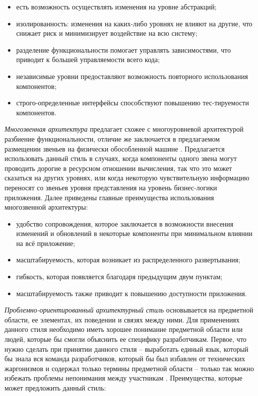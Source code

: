 \begin{itemize}
	\item есть возможность осуществлять изменения на уровне абстракций;
	\item изолированность: изменения на каких-либо уровнях не влияют на другие, что снижает риск и минимизирует воздействие на всю систему;
	\item разделение функциональности помогает управлять зависимостями, что приводит к большей управляемости всего кода;
  	\item независимые уровни предоставляют возможность повторного использования компонентов;
  	\item строго-определенные интерфейсы способствуют повышению тес-тируемости компонентов.
\end{itemize} 

\emph{Многозвенная архитектура} предлагает схожее с многоуровневой архитектурой разбиение функциональности, отличие же заключается в предлагаемом размещении 
звеньев на физически обособленной машине \cite{application_architecture_guide}. Предлагается использовать данный стиль в случаях, когда компоненты одного звена
могут проводить дорогие в ресурсном отношении вычисления, так что это может сказаться на других уровнях, или когда некоторую чувствительную информацию переносят 
со звеньев уровня представления на уровень бизнес-логики приложения. Далее приведены главные преимущества использования многозвенной архитектуры:

\begin{itemize}
	\item удобство сопровождения, которое заключается в возможности внесения изменений и обновлений в некоторые компоненты при минимальном влиянии на всё приложение;
	\item масштабируемость, которая возникает из распределенного развертывания;
	\item гибкость, которая появляется благодаря предыдущим двум пунктам;
  	\item масштабируемость также приводит к повышению доступности приложения.
\end{itemize} 

\emph{Проблемно-ориентированный архитектурный стиль} основывается на
предметной области, ее элементах, их поведении и связях между ними. Для
применениях данного стиля необходимо иметь хорошее понимание предметной области или людей, которые бы смогли объяснить ее специфику разработчикам. 
Первое, что нужно сделать при принятии данного стиля – выработать
единый язык, который бы знала вся команда разработчиков, который бы был
избавлен от технических жаргонизмов и содержал только термины предметной
области – только так можно избежать проблемы непонимания между участникам \cite{ddd_quickly}. Преимущества, которые может предложить данный стиль:

